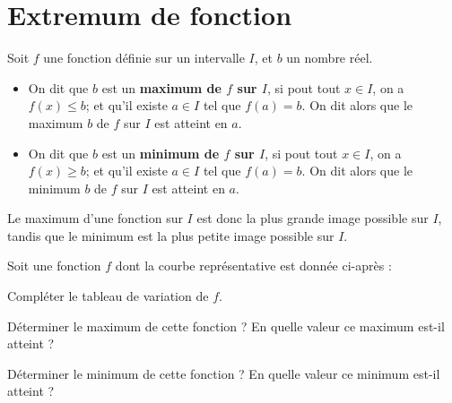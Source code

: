 \documentclass{article}
\begin{document}
\section{Extremum de fonction}
\begin{tcolorbox}
\begin{definition}
Soit $f$ une fonction définie sur un intervalle $I$, et $b$ un nombre réel.
\begin{itemize}
\item On dit que $b$ est un \textbf{maximum de $f$ sur $I$}, si pout tout $x \in I$, on a $f(x) \leq b$; et qu'il existe $a \in I$ tel que $f(a) = b$. On dit alors que le maximum $b$ de $f$ sur $I$ est atteint en $a$.
\item On dit que $b$ est un \textbf{minimum de $f$ sur $I$}, si pout tout $x \in I$, on a $f(x) \geq b$; et qu'il existe $a \in I$ tel que $f(a) = b$. On dit alors que le minimum $b$ de $f$ sur $I$ est atteint en $a$.
\end{itemize}
\end{definition}
\end{tcolorbox}
\begin{remark}
Le maximum d'une fonction sur $I$ est donc la plus grande image possible sur $I$, tandis que le minimum est la plus petite image possible sur $I$.
\end{remark}
\begin{example}
Soit une fonction $f$ dont la courbe représentative est donnée ci-après :
\begin{center}
\end{center}
\begin{enumquestions}
\item Compléter le tableau de variation de $f$.
\begin{center}
\end{center}
\item Déterminer le maximum de cette fonction ? En quelle valeur ce maximum est-il atteint ?

\answersline
\item Déterminer le minimum de cette fonction ? En quelle valeur ce minimum est-il atteint ? 

\answersline
\end{enumquestions}
\end{example}
\end{document}
